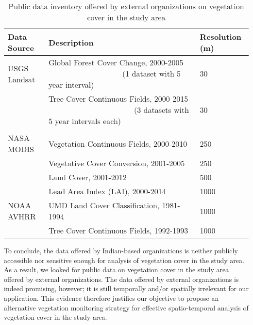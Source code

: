 \begin{table}[H]
	\small
	\centering
	\def\arraystretch{1.6}
	\begin{threeparttable}
		\caption{Public data inventory offered by external organizations on vegetation cover in the study area}
		\label{table7}
		\begin{tabular}{ L{3.25cm} L{8.5cm} L{2.9cm}}
			\toprule[0.25mm]
			Data Source & Description & Resolution (m)\\
			\midrule[0.35mm]
			USGS Landsat & Global Forest Cover Change, 2000-2005 ~~~~~~~~~~~~~~~~~~~(1 dataset with 5 year interval) & 30 \\
			& Tree Cover Continuous Fields, 2000-2015 ~~~~~~~~~~~~~~~~~~~~~~(3 datasets with 5 year intervals each) & 30 \\\\[-0.6cm]
			NASA MODIS  & Vegetation Continuous Fields, 2000-2010 & 250 \\
			& Vegetative Cover Conversion, 2001-2005 & 250 \\
			& Land Cover, 2001-2012 & 500  \\
			& Lead Area Index (LAI), 2000-2014 & 1000 \\
			NOAA AVHRR & UMD Land Cover Classification, 1981-1994 & 1000 \\
			& Tree Cover Continuous Fields, 1992-1993 & 1000  \\	
			\bottomrule[0.25mm]
		\end{tabular}
	\end{threeparttable}
\end{table}

\justify
To conclude, the data offered by Indian-based organizations is neither publicly accessible nor sensitive enough for analysis of vegetation cover in the study area. As a result, we looked for public data on vegetation cover in the study area offered by external organizations. The data offered by external organizations is indeed promising, however; it is still temporally and/or spatially irrelevant for our application. This evidence therefore justifies our objective to propose an alternative vegetation monitoring strategy for effective spatio-temporal analysis of vegetation cover in the study area.


